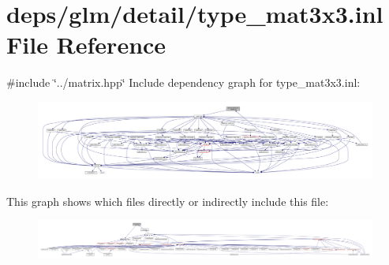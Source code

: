 \hypertarget{type__mat3x3_8inl}{}\section{deps/glm/detail/type\+\_\+mat3x3.inl File Reference}
\label{type__mat3x3_8inl}
{\ttfamily \#include \char`\"{}../matrix.\+hpp\char`\"{}}\newline
Include dependency graph for type\+\_\+mat3x3.\+inl\+:
\nopagebreak
\begin{figure}[H]
\begin{center}
\leavevmode
\includegraphics[width=350pt]{db/d7d/type__mat3x3_8inl__incl}
\end{center}
\end{figure}
This graph shows which files directly or indirectly include this file\+:
\nopagebreak
\begin{figure}[H]
\begin{center}
\leavevmode
\includegraphics[width=350pt]{d0/d47/type__mat3x3_8inl__dep__incl}
\end{center}
\end{figure}
